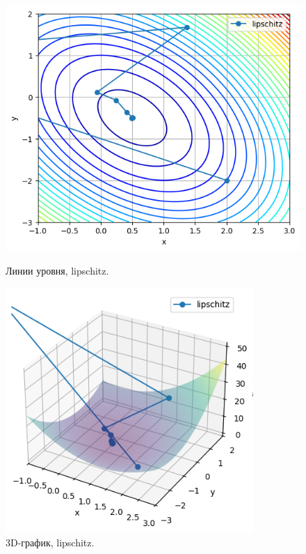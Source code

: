 \documentclass[a4paper,12pt]{article}
\begin{document}
\begin{figure}[H]
    \begin{minipage}{0.49\textwidth}
        \centering \includegraphics[width=\textwidth]{images/task2/plot_levels_2_2_lipschitz.png}
        \caption{Линии уровня, lipschitz.}
    \end{minipage}\hfill
    \begin{minipage}{0.49\textwidth}
        \centering \includegraphics[width=0.84\textwidth]{images/task2/plot_3d_2_2_lipschitz.png}
        \caption{3D-график, lipschitz.}
    \end{minipage}
\end{figure}
\end{document}
